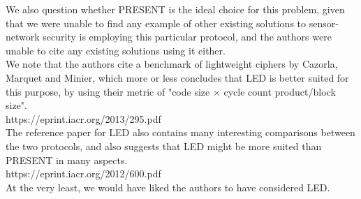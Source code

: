 We also question whether PRESENT is the ideal choice for this problem, given that we were unable to find any example of other existing solutions to sensor-network security is employing this particular protocol, and the authors were unable to cite any existing solutions using it either.\\
We note that the authors cite a benchmark of lightweight ciphers by Cazorla, Marquet and Minier, which more or less concludes that LED is better suited for this purpose, by using their metric of "code size $\times$ cycle count product/block size".\\
https://eprint.iacr.org/2013/295.pdf \\
The reference paper for LED also contains many interesting comparisons between the two protocols, and also suggests that LED might be more suited than PRESENT in many aspects.\\
https://eprint.iacr.org/2012/600.pdf \\

At the very least, we would have liked the authors to have considered LED.\\
